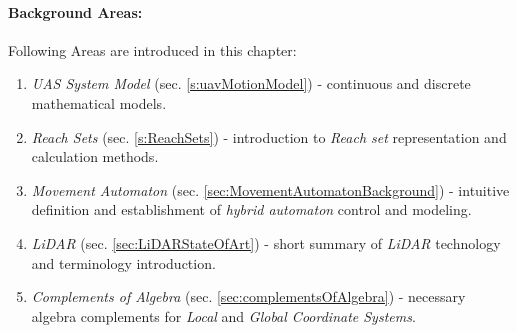 \paragraph{Background Areas:} Following Areas are introduced in this chapter:
\begin{enumerate}
    \item \emph{UAS System Model} (sec. \ref{s:uavMotionModel}) - continuous and discrete mathematical models.
    
    \item \emph{Reach Sets} (sec. \ref{s:ReachSets}) - introduction to \emph{Reach set} representation and calculation methods.
    
    \item \emph{Movement Automaton} (sec. \ref{sec:MovementAutomatonBackground}) - intuitive definition and establishment of \emph{hybrid automaton} control and modeling.
    
    \item \emph{LiDAR} (sec. \ref{sec:LiDARStateOfArt}) - short summary of \emph{LiDAR} technology and terminology introduction.
    
    \item \emph{Complements of Algebra} (sec. \ref{sec:complementsOfAlgebra}) - necessary algebra complements for \emph{Local} and \emph{Global Coordinate Systems}. 
\end{enumerate}
